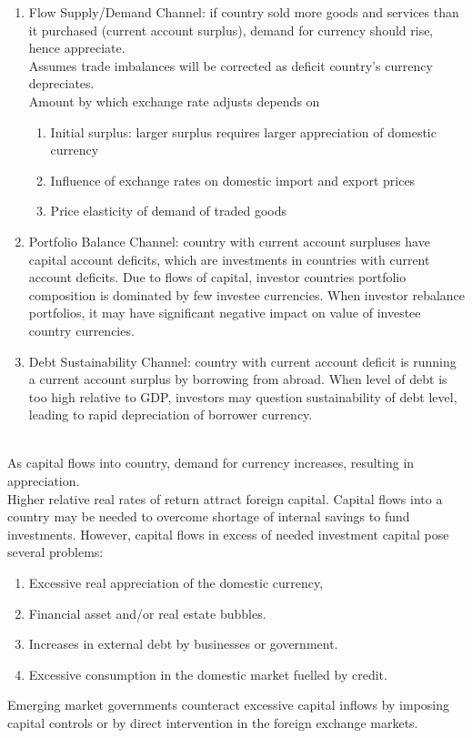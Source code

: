 \begin{remark} 
\begin{enumerate}[label=\roman*.]
\setlength{\itemsep}{0pt}
\item Flow Supply/Demand Channel: if country sold more goods and services than it purchased (current account surplus), demand for currency should rise, hence appreciate.\\
Assumes trade imbalances will be corrected as deficit country’s currency depreciates.\\
Amount by which exchange rate adjusts depends on
\begin{enumerate}[label=\arabic*.]
\setlength{\itemsep}{0pt}
\item Initial surplus: larger surplus requires larger appreciation of domestic currency
\item Influence of exchange rates on domestic import and export prices
\item Price elasticity of demand of traded goods 
\end{enumerate}
\item Portfolio Balance Channel: country with current account surpluses have capital account deficits, which are investments in countries with current account deficits. Due to flows of capital, investor countries portfolio composition is dominated by few investee currencies. When investor rebalance portfolios, it may have significant negative impact on value of investee country currencies.
\item Debt Sustainability Channel: country with current account deficit is running a current account surplus by borrowing from abroad. When level of debt is too high relative to GDP, investors may question sustainability of debt level, leading to rapid depreciation of borrower currency.
\end{enumerate}
\end{remark}

\begin{remark} \\
As capital flows into country, demand for currency increases, resulting in appreciation.\\
Higher relative real rates of return attract foreign capital. Capital flows into a country may be needed to overcome shortage of internal savings to fund investments. However, capital flows in excess of needed investment capital pose several problems:
\begin{enumerate}[label=\roman*.]
\setlength{\itemsep}{0pt}
\item Excessive real appreciation of the domestic currency,
\item Financial asset and/or real estate bubbles.
\item Increases in external debt by businesses or government. 
\item Excessive consumption in the domestic market fuelled by credit.
\end{enumerate}
Emerging market governments counteract excessive capital inflows by imposing capital controls or by direct intervention in the foreign exchange markets.
\end{remark}

